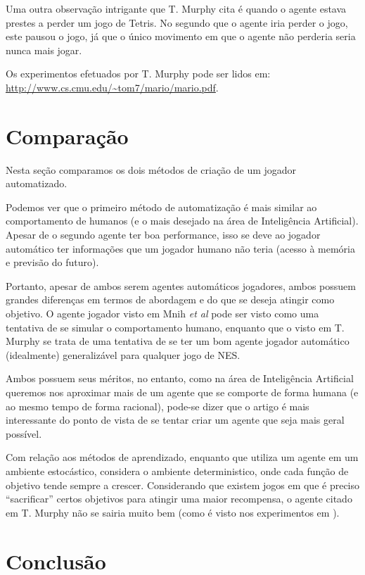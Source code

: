 \documentclass[a4paper,10pt]{article}
\theoremstyle{plain}
\begin{document}
Uma outra observação intrigante que T. Murphy cita é quando o agente estava prestes a perder um
jogo de Tetris. No segundo que o agente iria perder o jogo, este pausou o jogo, já que o único
movimento em que o agente não perderia seria nunca mais jogar.

Os experimentos efetuados por T. Murphy pode ser lidos em:
\url{http://www.cs.cmu.edu/~tom7/mario/mario.pdf}.

\section{Comparação}

Nesta seção comparamos os dois métodos de criação de um jogador automatizado.

Podemos ver que o primeiro método de automatização é mais similar ao comportamento de humanos (e o
mais desejado na área de Inteligência Artificial). Apesar de o segundo agente ter boa performance,
isso se deve ao jogador automático ter informações que um jogador humano não teria (acesso à
memória e previsão do futuro).

Portanto, apesar de ambos serem agentes automáticos jogadores, ambos possuem grandes diferenças em
termos de abordagem e do que se deseja atingir como objetivo. O agente jogador visto em Mnih
\textit{et al} pode ser visto como uma tentativa de se simular o comportamento humano, enquanto que
o visto em T. Murphy se trata de uma tentativa de se ter um bom agente jogador automático
(idealmente) generalizável para qualquer jogo de NES.

Ambos possuem seus méritos, no entanto, como na área de Inteligência Artificial queremos nos
aproximar mais de um agente que se comporte de forma humana (e ao mesmo tempo de forma racional),
pode-se dizer que o artigo \cite{mnih-et-al} é mais interessante do ponto de vista de se tentar
criar um agente que seja mais geral possível.

Com relação aos métodos de aprendizado, enquanto que \cite{mnih-et-al} utiliza um agente em um
ambiente estocástico, \cite{dr-murphy} considera o ambiente deterministico, onde cada função de
objetivo tende sempre a crescer. Considerando que existem jogos em que é preciso ``sacrificar''
certos objetivos para atingir uma maior recompensa, o agente citado em T. Murphy não se sairia
muito bem (como é visto nos experimentos em \cite{dr-murphy}).

\section{Conclusão}
\end{document}
